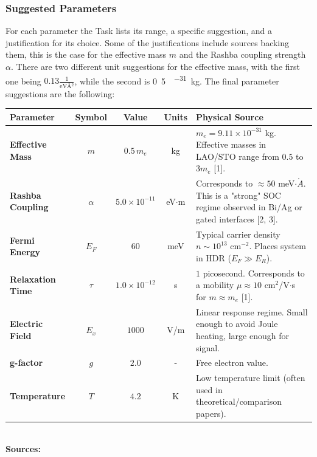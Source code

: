 \documentclass[
	fontsize = 11pt,
	paper = a4,
	draft = false,
	twoside = true,
	titlepage = false
]{scrartcl}
\numberwithin{equation}{subsection}
\begin{document}
	\subsubsection{Suggested Parameters} \label{appendix:paramSug}
	For each parameter the Task lists its range, a specific suggestion, and a justification for its choice. Some of the justifications include sources backing them, this is the case for the effective mass $m$ and the Rashba coupling strength $\alpha$. There are two different unit suggestions for the effective mass, with the first one being $0.13 \frac{1}{\mathrm{eV} \si{\angstrom^2}}$, while the second is \si{0.5  ^{-31} \kilogram}. The final parameter suggestions are the following:
	\begin{tcolorbox} [enhanced, breakable, title=Parameter Suggestions for the Implementation as Stated in the Output, colback=blue!5!white, colframe=blue!75!black] 
		\begin{tabular}{l c c c p{6cm}}
			\textbf{Parameter} & \textbf{Symbol} & \textbf{Value} & \textbf{Units} & \textbf{Physical Source} \\
			\midrule
			\textbf{Effective Mass} & $m$ & $0.5 \, m_e$ & kg & $m_e = 9.11 \times 10^{-31}$ kg. Effective masses in LAO/STO range from $0.5$ to $3 m_e$ [1]. \\
			\textbf{Rashba Coupling} & $\alpha$ & $5.0 \times 10^{-11}$ & eV$\cdot$m & Corresponds to $\approx 50$ meV$\cdot\mathring{A}$. This is a "strong" SOC regime observed in Bi/Ag or gated interfaces [2, 3]. \\
			\textbf{Fermi Energy} & $E_F$ & $60$ & meV & Typical carrier density $n \sim 10^{13}$ cm$^{-2}$. Places system in HDR ($E_F \gg E_R$). \\
			\textbf{Relaxation Time} & $\tau$ & $1.0 \times 10^{-12}$ & s & $1$ picosecond. Corresponds to a mobility $\mu \approx 10$ cm$^2$/V$\cdot$s for $m \approx m_e$ [1].\\
			\textbf{Electric Field} & $E_x$ & $1000$ & V/m & Linear response regime. Small enough to avoid Joule heating, large enough for signal. \\
			\textbf{g-factor} & $g$ & $2.0$ & - & Free electron value.\\
			\textbf{Temperature} & $T$ & $4.2$ & K & Low temperature limit (often used in theoretical/comparison papers).\\
		\end{tabular}\\
		\textbf{Sources:}\\
		\begin{enumerate}

\end{enumerate}
\end{tcolorbox}
\end{document}

